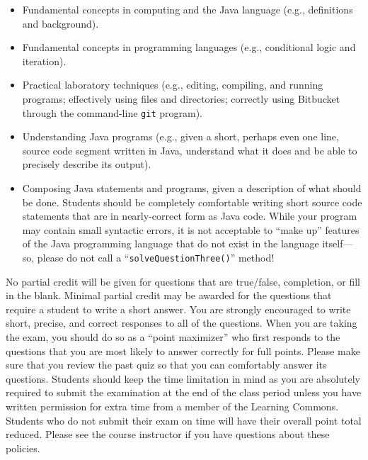 \vspace*{-.05in}
\begin{itemize}

  \itemsep 0in

  \item Fundamental concepts in computing and the Java language (e.g., definitions and background).

  \item Fundamental concepts in programming languages (e.g., conditional logic and iteration).

  \item Practical laboratory techniques (e.g., editing, compiling, and running programs; effectively using files and
    directories; correctly using Bitbucket through the command-line {\tt git} program).

  \item Understanding Java programs (e.g., given a short, perhaps even one line, source code segment written in Java,
    understand what it does and be able to precisely describe its output).

  \item Composing Java statements and programs, given a description of what should be done. Students should be completely
    comfortable writing short source code statements that are in nearly-correct form as Java code. While your program may
    contain small syntactic errors, it is not acceptable to ``make up'' features of the Java programming language that do
    not exist in the language itself---so, please do not call a ``{\tt solveQuestionThree()}'' method!

\end{itemize}

\noindent No partial credit will be given for questions that are true/false, completion, or fill in the blank. Minimal
partial credit may be awarded for the questions that require a student to write a short answer. You are strongly
encouraged to write short, precise, and correct responses to all of the questions. When you are taking the exam, you
should do so as a ``point maximizer'' who first responds to the questions that you are most likely to answer correctly
for full points. Please make sure that you review the past quiz so that you can comfortably answer its questions.
Students should keep the time limitation in mind as you are absolutely required to submit the examination at the end of
the class period unless you have written permission for extra time from a member of the Learning Commons.  Students who
do not submit their exam on time will have their overall point total reduced.  Please see the course instructor if you
have questions about these policies.

